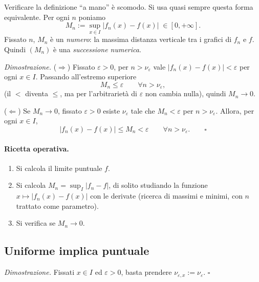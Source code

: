 Verificare la definizione ``a mano'' è scomodo. Si usa quasi sempre questa
forma equivalente. Per ogni $n$ poniamo
\[
  M_n := \sup_{x \in I} |f_n(x) - f(x)| \;\in [0, +\infty] .
\]
Fissato $n$, $M_n$ è un \emph{numero}: la massima distanza verticale tra i
grafici di $f_n$ e $f$. Quindi $(M_n)$ è una \emph{successione numerica}.


\noindent\textit{Dimostrazione.}
($\Rightarrow$) Fissato $\varepsilon > 0$, per $n > \nu_\varepsilon$ vale
$|f_n(x) - f(x)| < \varepsilon$ per ogni $x \in I$. Passando all'estremo
superiore
\[
  M_n \le \varepsilon \qquad \forall n > \nu_\varepsilon ,
\]
(il $<$ diventa $\le$, ma per l'arbitrarietà di $\varepsilon$ non cambia nulla),
quindi $M_n \to 0$.

($\Leftarrow$) Se $M_n \to 0$, fissato $\varepsilon > 0$ esiste
$\nu_\varepsilon$ tale che $M_n < \varepsilon$ per $n > \nu_\varepsilon$. Allora,
per ogni $x \in I$,
\[
  |f_n(x) - f(x)| \le M_n < \varepsilon \qquad \forall n > \nu_\varepsilon . \qquad \square
\]

\paragraph{Ricetta operativa.}
\begin{enumerate}
  \item Si calcola il limite puntuale $f$.
  \item Si calcola $M_n = \sup_I |f_n - f|$, di solito studiando la funzione
        $x \mapsto |f_n(x) - f(x)|$ con le derivate (ricerca di massimi e
        minimi, con $n$ trattato come parametro).
  \item Si verifica se $M_n \to 0$.
\end{enumerate}

\subsection{Uniforme implica puntuale}


\noindent\textit{Dimostrazione.} Fissati $x \in I$ ed $\varepsilon > 0$, basta
prendere $\nu_{\varepsilon,x} := \nu_\varepsilon$. \hfill $\square$

